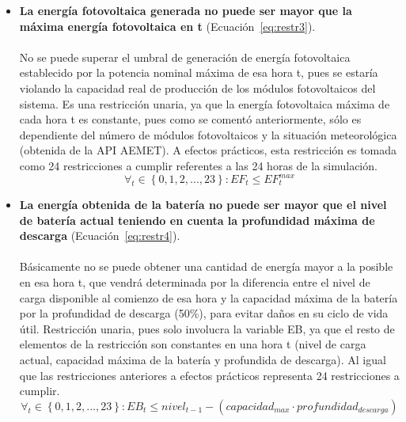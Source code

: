 \begin{itemize}
\item \textbf{La energía fotovoltaica generada no puede ser mayor que la máxima energía fotovoltaica en t} (Ecuación~\ref{eq:restr3}).\\ \\No se puede superar el umbral de generación de energía fotovoltaica establecido por la potencia nominal máxima de esa hora t, pues se estaría violando la capacidad real de producción de los módulos fotovoltaicos del sistema. Es una restricción unaria, ya que la energía fotovoltaica máxima de cada hora t es constante, pues como se comentó anteriormente, sólo es dependiente del número de módulos fotovoltaicos y la situación meteorológica (obtenida de la API AEMET). A efectos prácticos, esta restricción es tomada como 24 restricciones a cumplir referentes a las 24 horas de la simulación.
\begin{equation}
        \label{eq:restr3}
        \forall_{t} \in \left\{ 0, 1, 2, ..., 23 \right\} : EF_{t} \leq EF_{t}^{max}
\end{equation}

\item \textbf{La energía obtenida de la batería no puede ser mayor que el nivel de batería actual teniendo en cuenta la profundidad máxima de descarga} (Ecuación~\ref{eq:restr4}).\\ \\Básicamente no se puede obtener una cantidad de energía mayor a la posible en esa hora t, que vendrá determinada por la diferencia entre el  nivel de carga disponible al comienzo de esa hora y la capacidad máxima de la batería por la profundidad de descarga (50\%), para evitar daños en su ciclo de vida útil. Restricción unaria, pues solo involucra la variable EB, ya que el resto de elementos de la restricción son constantes en una hora t (nivel de carga actual, capacidad máxima de la batería y profundida de descarga). Al igual que las restricciones anteriores a efectos prácticos representa 24 restricciones a cumplir.
\begin{equation}
        \label{eq:restr4}
        \forall_{t} \in \left\{ 0, 1, 2, ..., 23 \right\} : EB_{t} \leq nivel_{t-1} - (capacidad_{max} \cdot profundidad_{descarga})
\end{equation}


\end{itemize}
